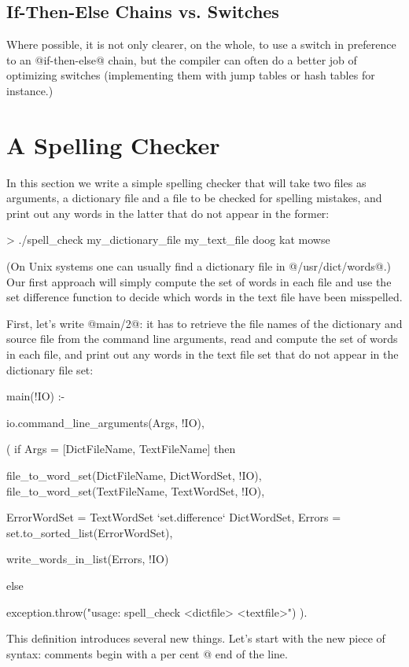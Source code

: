 \subsection{If-Then-Else Chains vs. Switches}

Where possible, it is not only clearer, on the whole, to use a switch in
preference to an @if-then-else@ chain, but the compiler can often do a
better job of optimizing switches (implementing them with jump tables or
hash
tables for instance.)



\section{A Spelling Checker}

In this section we write a simple spelling checker that will take two
files as arguments, a dictionary file and a file to be checked for spelling
mistakes, and print out any words in the latter that do not appear in the
former:
\begin{myverbatim}
> ./spell_check my_dictionary_file my_text_file
  doog
  kat
  mowse
\end{myverbatim}
(On Unix systems one can usually find a dictionary file in
@/usr/dict/words@.)
Our first approach will simply compute the set of words in each file
and use the set difference function to decide which words in the text file
have been misspelled.

First, let's write @main/2@: it has to retrieve the file names of the
dictionary and source file from the command line arguments, read
and compute the set of words in each file, and print out any words in
the text file set that do not appear in the dictionary file set:
\begin{myverbatim}
main(!IO) :-

    io.command_line_arguments(Args, !IO),

    ( if Args = [DictFileName, TextFileName] then

        file_to_word_set(DictFileName, DictWordSet, !IO),
        file_to_word_set(TextFileName, TextWordSet, !IO),

        ErrorWordSet = TextWordSet `set.difference` DictWordSet,
        Errors       = set.to_sorted_list(ErrorWordSet),

        write_words_in_list(Errors, !IO)

      else

        exception.throw("usage: spell_check <dictfile> <textfile>")
    ).
\end{myverbatim}
This definition introduces several new things.  Let's start with the new
piece of syntax: comments begin with a per cent @%
end of the line.

